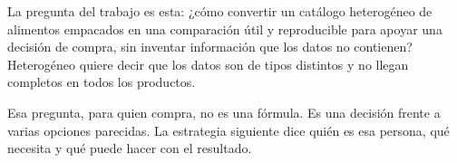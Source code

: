 La pregunta del trabajo es esta: ¿cómo convertir un catálogo heterogéneo de alimentos empacados en una comparación útil y reproducible para apoyar una decisión de compra, sin inventar información que los datos no contienen? Heterogéneo quiere decir que los datos son de tipos distintos y no llegan completos en todos los productos.

Esa pregunta, para quien compra, no es una fórmula. Es una decisión frente a varias opciones parecidas. La estrategia siguiente dice quién es esa persona, qué necesita y qué puede hacer con el resultado.
